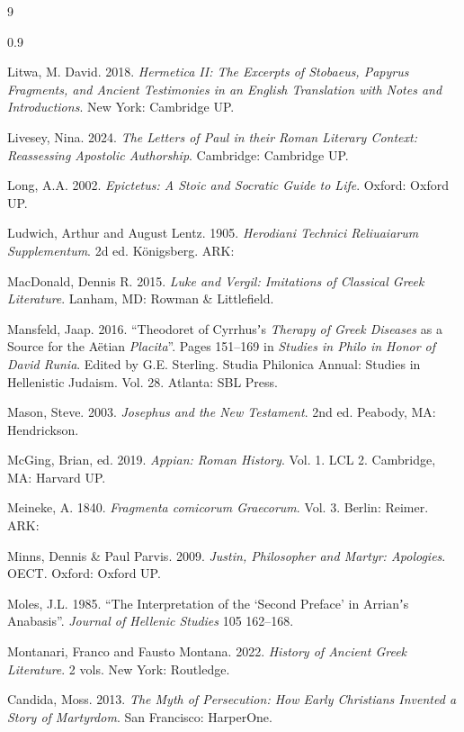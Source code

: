 \begin{thebibliography}{9}
\begin{spacing}{0.9}
\begin{small}
Litwa, M. David. 2018. %
\textit{Hermetica II: The Excerpts of Stobaeus, Papyrus Fragments, %
and Ancient Testimonies in an English Translation with Notes and Introductions}. %
New York: Cambridge UP. %

Livesey, Nina. 2024. %
\textit{The Letters of Paul in their Roman Literary Context: %
Reassessing Apostolic Authorship}. %
Cambridge: Cambridge UP.

Long, A.A. 2002. %
\textit{Epictetus: A Stoic and Socratic Guide to Life}. %
Oxford: Oxford UP. %

Ludwich, Arthur and August Lentz. 1905. %
\textit{Herodiani Technici Reliuaiarum Supplementum}. %
2d ed. Königsberg. %
ARK: 

MacDonald, Dennis R. 2015. 
\textit{Luke and Vergil: Imitations of Classical Greek Literature}. %
Lanham, MD: Rowman \& Littlefield. %

Mansfeld, Jaap. 2016. %
“Theodoret of Cyrrhusʼs \textit{Therapy of Greek Diseases} as a Source for the Aëtian \textit{Placita}”. %
Pages 151--169 in \textit{Studies in Philo in Honor of David Runia}. %
Edited by G.E. Sterling. %
Studia Philonica Annual: Studies in Hellenistic Judaism. Vol. 28. %
Atlanta: SBL Press. %

Mason, Steve. 2003. %
\textit{Josephus and the New Testament}. 2nd ed. 
Peabody, MA: Hendrickson. %

McGing, Brian, ed. 2019. %
\textit{Appian: Roman History}. Vol. 1. %
LCL 2. Cambridge, MA: Harvard UP. %

Meineke, A. 1840. \textit{Fragmenta comicorum Graecorum}. %
Vol. 3. Berlin: Reimer. %
ARK: 

Minns, Dennis \& Paul Parvis. 2009. %
\textit{Justin, Philosopher and Martyr: Apologies}. %
OECT. Oxford: Oxford UP. %

Moles, J.L. 1985. %
“The Interpretation of the ‘Second Preface’ in Arrianʼs Anabasis”. %
\textit{Journal of Hellenic Studies} 105 162--168. %

Montanari, Franco and Fausto Montana. 2022. %
\textit{History of Ancient Greek Literature}. 2 vols. %
New York: Routledge. %

Candida, Moss. 2013. %
\textit{The Myth of Persecution: How Early Christians Invented a Story of Martyrdom}. %
San Francisco: HarperOne. %


\end{small}
\end{spacing}
\end{thebibliography}
